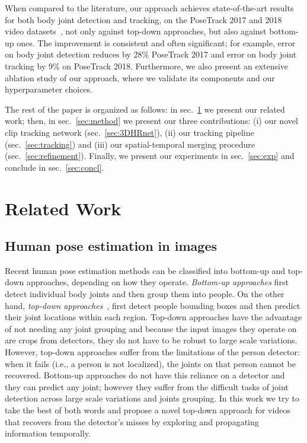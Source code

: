\documentclass[10pt,twocolumn,letterpaper]{article}
\begin{document}
When compared to the literature, our approach achieves state-of-the-art results for both body joint detection and tracking, on the PoseTrack 2017 and 2018 video datasets~\cite{PoseTrack}, not only against top-down approaches, but also against bottom-up ones. The improvement is consistent and often significant; for example, error on body joint detection reduces by 28\% PoseTrack 2017 and error on body joint tracking by 9\% on PoseTrack 2018. Furthermore, we also present an extensive ablation study of our approach, where we validate its components and our hyperparameter choices. 

The rest of the paper is organized as follows: in sec.~\ref{sec:rl} we present our related work; then, in sec.~\ref{sec:method} we present our three contributions: (i) our novel clip tracking network (sec.~\ref{sec:3DHRnet}), (ii) our tracking pipeline (sec.~\ref{sec:tracking}) and (iii) our spatial-temporal merging procedure (sec.~\ref{sec:refinement}). Finally, we present our experiments in sec.~\ref{sec:exp} and conclude in sec.~\ref{sec:concl}.

\section{Related Work}\label{sec:rl}
\subsection{Human pose estimation in images}
Recent human pose estimation methods can be classified into bottom-up and top-down approaches, depending on how they operate. 
{\it Bottom-up approaches} \cite{cao2018openpose, insafutdinov16eccv, newell2017associative, pishchulin16cvpr} first detect individual body joints and then group them into people. 
On the other hand, {\it top-down approaches}~\cite{chen2018cascaded,papandreou17cvpr, he2017mask, sun2019deep}, first detect people bounding boxes and then predict their joint locations within each region. 
Top-down approaches have the advantage of not needing any joint grouping and because the input images they operate on are crops from detectors, they do not have to be robust to large scale variations. However, top-down approaches suffer from the limitations of the person detector: when it fails (i.e., a person is not localized), the joints on that person cannot be recovered. Bottom-up approaches do not have this reliance on a detector and they can predict any joint; however they suffer from the difficult tasks of joint detection across large scale variations and joints grouping. In this work we try to take the best of both words and propose a novel top-down approach for videos that recovers from the detector's misses by exploring and propagating information temporally. 
\end{document}
